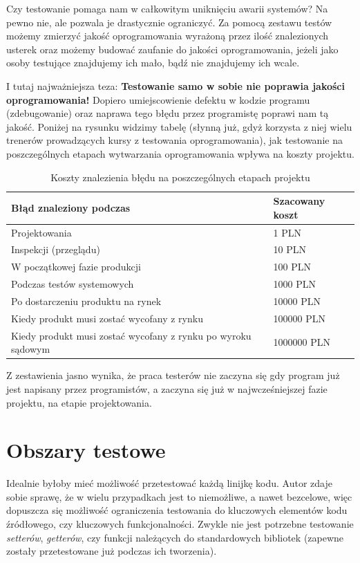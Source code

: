 Czy testowanie pomaga nam w całkowitym uniknięciu awarii systemów? Na pewno nie, ale pozwala je drastycznie ograniczyć. Za pomocą zestawu testów możemy zmierzyć jakość oprogramowania wyrażoną przez ilość znalezionych usterek oraz możemy budować zaufanie do jakości oprogramowania, jeżeli jako osoby testujące znajdujemy ich mało, bądź nie znajdujemy ich wcale.

I tutaj najważniejsza teza: \textbf{Testowanie samo w sobie nie poprawia jakości oprogramowania!} Dopiero umiejscowienie defektu w kodzie programu (zdebugowanie) oraz naprawa tego błędu przez programistę poprawi nam tą jakość. Poniżej na rysunku widzimy tabelę (słynną już, gdyż korzysta z niej wielu trenerów prowadzących kursy z testowania oprogramowania), jak testowanie na poszczególnych etapach wytwarzania oprogramowania wpływa na koszty projektu.

\begin{table}[]
\centering
\caption{Koszty znalezienia błędu na poszczególnych etapach projektu}
\label{tab:koszty_bledu}
\begin{tabular}{|l|l|}
\hline
\textbf{Błąd znaleziony podczas} & \textbf{Szacowany koszt} \\ \hline
Projektowania & 1 PLN	\\ \hline
Inspekcji (przeglądu) & 10 PLN	\\ \hline
W początkowej fazie produkcji & 100 PLN	\\ \hline
Podczas testów systemowych & 1000 PLN	\\ \hline
Po dostarczeniu produktu na rynek & 10000 PLN	\\ \hline
Kiedy produkt musi zostać wycofany z rynku & 100000 PLN	\\ \hline
Kiedy produkt musi zostać wycofany z rynku po wyroku sądowym & 1000000 PLN	\\ \hline
\end{tabular}
\end{table}

Z zestawienia jasno wynika, że praca testerów nie zaczyna się gdy program już jest napisany przez programistów, a zaczyna się już w najwcześniejszej fazie projektu, na etapie projektowania.

\section{Obszary testowe}
Idealnie byłoby mieć możliwość przetestować każdą linijkę kodu. Autor zdaje sobie sprawę, że w wielu przypadkach jest to niemożliwe, a nawet bezcelowe, więc dopuszcza się możliwość ograniczenia testowania do kluczowych elementów kodu źródłowego, czy kluczowych funkcjonalności. Zwykle nie jest potrzebne testowanie \textit{setterów}, \textit{getterów}, czy funkcji należących do standardowych bibliotek (zapewne zostały przetestowane już podczas ich tworzenia). 

